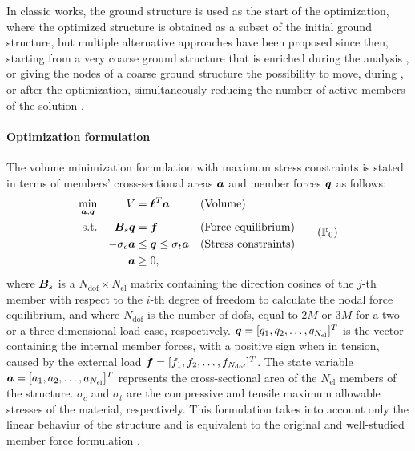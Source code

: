 In classic works, the ground structure is used as the start of the optimization, where the optimized structure is obtained as a subset of the initial ground structure, but multiple alternative approaches have been proposed since then, \eg starting from a very coarse ground structure that is enriched during the analysis , or giving the nodes of a coarse ground structure the possibility to move, during , or after the optimization, simultaneously reducing the number of active members of the solution .

\paragraph{Optimization formulation}
The volume minimization formulation with maximum stress constraints is stated in terms of members' cross-sectional areas $\bm{a}$ and member forces $\bm{q}$ as follows:
\begin{equation}
    \begin{aligned}
    \min_{\vect{a}, \vect{q}}   && V &= \vect{\ell}^{T}\vect{a} && \textrm{(Volume)}\\
    \textrm{s.t.}   && \matr{B}_s\vect{q} &= \vect{f} && \textrm{(Force equilibrium)}\\
    && -\sigma_c\vect{a} &\leq \vect{q} \leq \sigma_t\vect{a} && \textrm{(Stress constraints)} \\
    && \vect{a} &\geq 0, \\
    \end{aligned}
    \tag{$\mathbb{P}_0$}
    \label{eq:optim_original}
\end{equation}
where $\bm{B}_s$ is a $N_{\text{dof}} \times N_{\text{el}}$ matrix containing the direction cosines of the $j$-th member with respect to the $i$-th degree of freedom to calculate the nodal force equilibrium, and where $N_{\text{dof}}$ is the number of \gls{dofs}, equal to $2M$ or $3M$ for a two- or a three-dimensional load case, respectively. $\bm{q} = [q_1, q_2, \ldots,q_{N_{\text{el}}}]^T$ is the vector containing the internal member forces, with a positive sign when in tension, caused by the external load $\bm{f} = [f_1, f_2, \ldots,f_{N_{\text{dof}}}]^T$. The state variable $\bm{a} = [a_1, a_2, \ldots,a_{N_{\text{el}}}]^T$ represents the cross-sectional area of the $N_{\text{el}}$ members of the structure. $\sigma_c$ and $\sigma_t$ are the compressive and tensile maximum allowable stresses of the material, respectively. This formulation takes into account only the linear behaviur of the structure and is equivalent to the original and well-studied member force formulation . 

